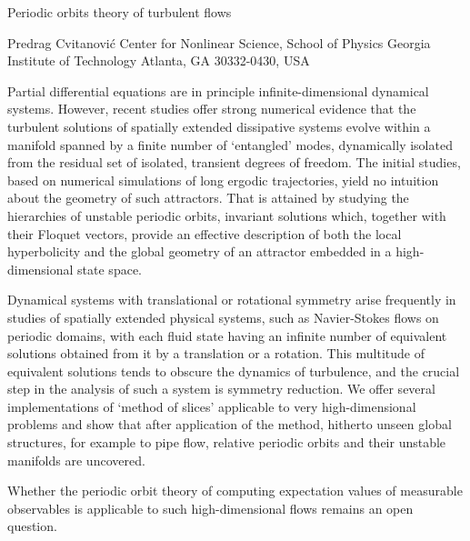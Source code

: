 
Periodic orbits theory of turbulent flows

    Predrag Cvitanović
    Center for Nonlinear Science, School of Physics
    Georgia Institute of Technology
    Atlanta, GA 30332-0430, USA

Partial differential equations are in principle infinite-dimensional
dynamical systems. However, recent studies offer strong numerical
evidence that the turbulent solutions of spatially
extended dissipative systems evolve within a manifold spanned by a
finite number of `entangled' modes, dynamically isolated from
the residual set of isolated, transient degrees of freedom. The initial
studies, based on numerical simulations of long ergodic trajectories,
yield no intuition about the geometry of such attractors. That is
attained by studying the hierarchies of unstable periodic orbits, invariant
solutions which, together with their Floquet vectors, provide an
effective description  of both the local hyperbolicity and the global
geometry of an attractor embedded in a high-dimensional state space.

Dynamical systems with translational or rotational symmetry arise
frequently in studies of spatially extended physical systems, such as
Navier-Stokes flows on periodic domains, with each fluid state having an
infinite number of equivalent solutions obtained from it by a translation
or a rotation. This multitude of equivalent solutions tends to obscure
the dynamics of turbulence, and the crucial step in the analysis of such
a system is symmetry reduction. We offer several implementations of
`method of slices' applicable to very high-dimensional problems and show
that after application of the method, hitherto unseen global structures,
for example to pipe flow, relative periodic orbits and their unstable
manifolds are uncovered.

Whether the periodic orbit theory of computing expectation values of
measurable observables is applicable to such high-dimensional flows
remains an open question.
